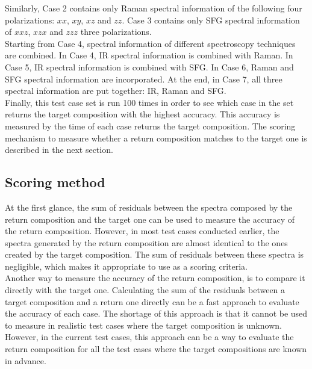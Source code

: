 Similarly, Case 2 contains only Raman spectral information of the following four polarizations: $xx$, $xy$, $xz$ and $zz$. Case 3 contains only SFG spectral information of $xxz$, $xzx$ and $zzz$ three polarizations. \\

Starting from Case 4, spectral information of different spectroscopy techniques are combined. In Case 4, IR spectral information is combined with Raman. In Case 5, IR spectral information is combined with SFG. In Case 6, Raman and SFG spectral information are incorporated. At the end, in Case 7, all three spectral information are put together: IR, Raman and SFG. \\

Finally, this test case set is run 100 times in order to see which case in the set returns the target composition with the highest accuracy. This accuracy is measured by the time of each case returns the target composition. The scoring mechanism to measure whether a return composition matches to the target one is described in the next section. \\

\subsection{Scoring method}

At the first glance, the sum of residuals between the spectra composed by the return composition and the target one can be used to measure the accuracy of the return composition. However, in most test cases conducted earlier, the spectra generated by the return composition are almost identical to the ones created by the target composition. The sum of residuals between these spectra is negligible, which makes it appropriate to use as a scoring criteria. \\

Another way to measure the accuracy of the return composition, is to compare it directly with the target one. Calculating the sum of the residuals between a target composition and a return one directly can be a fast approach to evaluate the accuracy of each case. The shortage of this approach is that it cannot be used to measure in realistic test cases where the target composition is unknown. However, in the current test cases, this approach can be a way to evaluate the return composition for all the test cases where the target compositions are known in advance. \\

